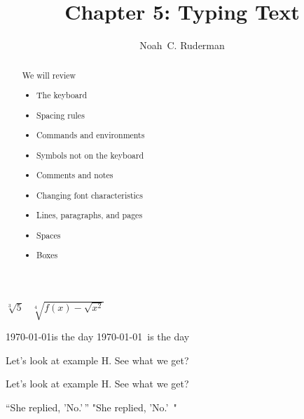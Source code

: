 \documentclass[12pt,draft]{amsart} %
\begin{document}
	\title{Chapter 5: Typing Text}
	\author[N.\, C. Ruderman]{Noah~C. Ruderman}

	\begin{abstract}
		We will review
		\begin{center}
		\begin{itemize}
			\item The keyboard
			\item Spacing rules
			\item Commands and environments
			\item Symbols not on the keyboard
			\item Comments and notes
			\item Changing font characteristics
			\item Lines, paragraphs, and pages
			\item Spaces
			\item Boxes
		\end{itemize}
		\end{center}
	\end{abstract}

	\maketitle 

$\sqrt[3]{5}$ \ $\sqrt[4]{f(x) - \sqrt{x^2}}$

\today is the day  \today \ is the day

Let's look at example H. See what we get? 

Let's look at example H\@. See what we get? %


``She replied, 'No.'\,'' %
"She replied, 'No.'\, " %
\end{document}
